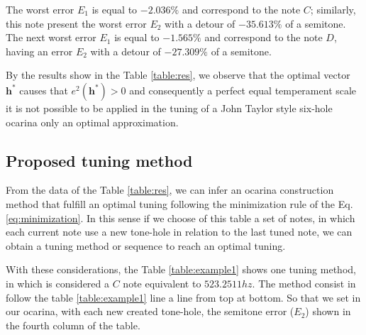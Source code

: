 \documentclass[11pt,twocolumn]{article}
\begin{document}
The worst error $E_1$ is equal to $-2.036\%$ and correspond to the note $C$; 
similarly, this note present the worst error $E_2$ with a detour of $-35.613\%$ of a semitone. 
The next worst error $E_1$ is equal to $-1.565\%$ and correspond to the note $D$,
having an error $E_2$ with a detour of $-27.309\%$ of a semitone.

By the results show in the Table \ref{table:res}, we observe that 
the optimal vector $\mathbf{h^*}$ causes that $e^2(\mathbf{h^*})> 0$
and consequently a perfect equal temperament scale 
it is not possible to be applied in the tuning of a John Taylor style six-hole ocarina
only an optimal approximation. 

\subsection{Proposed tuning method}
From the data of the Table \ref{table:res}, 
we can infer an ocarina construction method that fulfill 
an optimal tuning following the minimization rule of the Eq. \ref{eq:minimization}.
In this sense if we choose of this table a set of notes, 
in which each current note use a new tone-hole in relation to the last tuned note, 
we can obtain a tuning method or sequence to reach an optimal tuning.

With these considerations, the Table \ref{table:example1} shows one tuning method, 
in which is considered a $C$ note equivalent to $523.2511 hz$.
The method consist in follow the table \ref{table:example1} line a line from top at bottom. 
So that we set in our ocarina, with each new created tone-hole, 
the semitone error ($E_2$) shown in the fourth column of the table.
\end{document}
